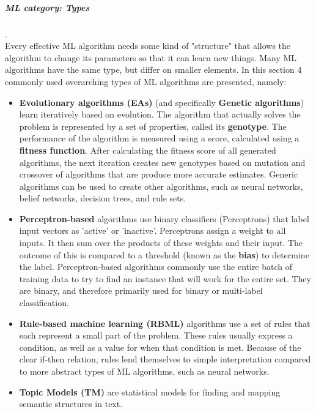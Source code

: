 \subparagraph{ML category: Types}
.\\
Every effective ML algorithm needs some kind of "structure" that allows the algorithm to change its parameters so that it can learn new things. Many ML algorithms have the same type, but differ on smaller elements. In this section 4 commonly used overarching types of ML algorithms are presented, namely:
\begin{itemize}
	\item \textbf{Evolutionary algorithms (EAs)} (and 
		specifically \textbf{Genetic algorithms}) learn iteratively based on evolution. The algorithm that actually solves the problem is represented by a set of properties, called its \textbf{genotype}. The performance of the algorithm is measured using a score, calculated using a \textbf{fitness function}. After calculating the fitness score of all generated algorithms, the next iteration creates new genotypes based on mutation and crossover of algorithms that are produce more accurate estimates. Generic algorithms can be used to create other algorithms, such as neural networks, belief networks, decision trees, and rule sets.
	\item \textbf{Perceptron-based}
		algorithms use binary classifiers (Perceptrons) that label input vectors as 'active' or 'inactive'. Perceptrons assign a weight to all inputs. It then sum over the products of these weights and their input. The outcome of this is compared to a threshold (known as the \textbf{bias}) to determine the label. Perceptron-based algorithms commonly use the entire batch of training data to try to find an instance that will work for the entire set. They are binary, and therefore primarily used for binary or multi-label classification.
	\item \textbf{Rule-based machine learning (RBML)}
		algorithms use a set of rules that each represent a small part of the problem. These rules usually express a condition, as well as a value for when that condition is met. Because of the clear if-then relation, rules lend themselves to simple interpretation compared to more abstract types of ML algorithms, such as neural networks.
	\item \textbf{Topic Models (TM)}
		are statistical models for finding and mapping semantic structures in text.
\end{itemize}

